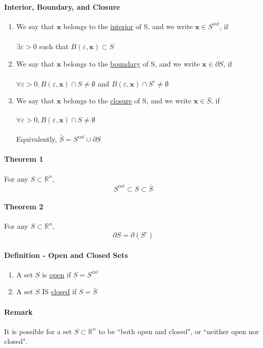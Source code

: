 \documentclass[11pt]{article}
\newcommand{\tb}[1]{\textbf{#1}}
\newcommand{\real}[0]{\mathbb{R}}
\newcommand{\under}[1]{\underline{#1}}
\newcommand{\vx}[0]{\tb{x}}
\begin{document}
\paragraph{Interior, Boundary, and Closure}
\begin{enumerate}
    \item We say that $\vx$ belongs to the \under{interior} of S, and we write $\vx \in S^{int}$, if \\\\ $\exists \varepsilon > 0$ such that $B(\varepsilon, \vx) \subset S$
    \item We say that $\vx$ belongs to the \under{boundary} of S, and we write $\vx \in \partial S$, if \\\\ $\forall \varepsilon > 0, B(\varepsilon, \vx) \cap S \neq \emptyset$ and
    $B(\varepsilon, \vx) \cap S^c \neq \emptyset$
    \item We say that $\vx$ belongs to the \under{closure} of S, and we write $\vx \in \bar{S}$, if \\\\ $\forall \varepsilon > 0, B(\varepsilon, \vx) \cap S \neq \emptyset$ \\\\
    Equivalently, $\bar{S} = S^{int} \cup \partial S$
\end{enumerate}
\paragraph{Theorem 1} For any $S \subset \real^n$, $$S^{int} \subset S \subset \bar{S}$$
\paragraph{Theorem 2} For any $S \subset \real^n$, $$\partial S = \partial (S^c)$$
\paragraph{Definition - Open and Closed Sets}
\begin{enumerate}
    \item A set $S$ is \under{open} if $S = S^{int}$
    \item A set $S$ IS \under{closed} if $S = \bar{S}$
\end{enumerate}
\paragraph{Remark}
It is possible for a set $S \subset \real^n$ to be ``both open and closed", or ``neither open nor closed".
\end{document}
